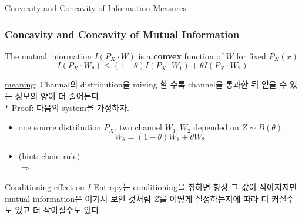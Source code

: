 \documentclass[9pt]{beamer}
\begin{document}
\begin{section}{Convexity and Concavity of Information Measures}
        \begin{frame}
            \frametitle{Concavity and Concavity of Mutual Information}
            \begin{corollary}
                The mutual information $I(P_X \cdot W)$ is a \textbf{convex} function of $W$ for fixed $P_X(x)$
                $$ I(P_X \cdot W_\theta) \le (1-\theta) I (P_X \cdot W_1) + \theta I(P_X\cdot W_2)$$
            \end{corollary}
            \checkmark \underline{meaning}: Channal의 distribution을 mixing 할 수록 channel을 통과한 뒤 얻을 수 있는 정보의 양이 더 줄어든다.
            \vspace{0.2cm}
            \\ $\ast$ \underline{Proof}: 다음의 system을 가정하자.
            \begin{itemize}
                \item one source distribution $P_X$, two channel  $W_1, W_2$ depended on $Z \sim B(\theta)$.
                $$ W_{\theta} = (1-\theta)W_1 + \theta W_2 $$
                \item (hint: chain rule)
                \\ $\Rightarrow$
            \end{itemize}
            \vspace{1.2cm}
            \begin{alertblock}{Conditioning effect on $I$}
                Entropy는 conditioning을 취하면 항상 그 값이 작아지지만 mutual information은 여기서 보인 것처럼 $Z$를 어떻게 설정하는지에 따라 더 커질수도 있고 더 작아질수도 있다.
            \end{alertblock}
        \end{frame}

    \end{section}
\end{document}
